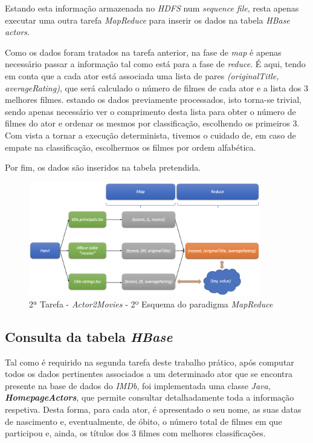 \documentclass[a4paper]{report}
\begin{document}
{			Estando esta informação armazenada no \textit{HDFS} num \textit{sequence file}, resta apenas executar uma outra tarefa \textit{MapReduce} para inserir os dados na tabela \textit{HBase actors}.
			
			Como os dados foram tratados na tarefa anterior, na fase de \textit{map} é apenas necessário passar a informação tal como está para a fase de \textit{reduce}. É aqui, tendo em conta que a cada ator está associada uma lista de pares \textit{(originalTitle, averageRating)}, que será calculado o número de filmes de cada ator e a lista dos 3 melhores filmes. estando os dados previamente processados, isto torna-se trivial, sendo apenas necessário ver o comprimento desta lista para obter o número de filmes do ator e ordenar os mesmos por classificação, escolhendo os primeiros 3. Com vista a tornar a execução determinista, tivemos o cuidado de, em caso de empate na classificação, escolhermos os filmes por ordem alfabética.
			
			Por fim, os dados são inseridos na tabela pretendida.
			\begin{figure}[H]
				\centering
				\includegraphics[width=0.9\textwidth]{Images/Task 2 - Actor2Movies - (2) MapReduce.png}
				\caption{2ª Tarefa - \textit{Actor2Movies} - 2º Esquema do paradigma \textit{MapReduce}}
				\label{fig:20}
			\end{figure}

		\subsection{Consulta da tabela \textit{HBase}} \label{subsec:Task2-4}
		Tal como é requirido na segunda tarefa deste trabalho prático, após computar todos os dados pertinentes associados a um determinado ator que se encontra presente na base de dados do \textit{IMDb}, foi implementada uma classe \textit{Java}, \textit{\textbf{HomepageActors}}, que permite consultar detalhadamente toda a informação respetiva.
		Desta forma, para cada ator, é apresentado o seu nome, as suas datas de nascimento e, eventualmente, de óbito, o número total de filmes em que participou e, ainda, os títulos dos 3 filmes com melhores classificações.
		
}
\end{document}

